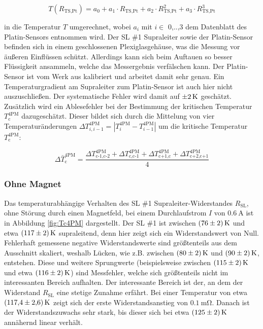 \begin{equation*}
  T(R_{\text{TS,Pt}}) = a_0 + a_1 \cdot R_{\text{TS,Pt}} + a_2 \cdot R_{\text{TS,Pt}}^2
  + a_3 \cdot R_{\text{TS,Pt}}^3
  \label{FA2}
\end{equation*}

\noindent
in die Temperatur $T$ umgerechnet, wobei $a_{i}$ mit $i \in$ {0,..,3} dem
Datenblatt des Platin-Sensors entnommen wird. Der SL \#1 Supraleiter sowie
der Platin-Sensor befinden sich in einem geschlossenen Plexiglasgehäuse, was
die Messung vor äußeren Einflüssen schützt. Allerdings kann sich beim Auftauen
so besser Flüssigkeit ansammeln, welche das Messergebnis verfälschen kann.
Der Platin-Sensor ist vom Werk aus kalibriert und arbeitet damit sehr genau.
Ein Temperaturgradient am Supraleiter zum Platin-Sensor ist auch hier nicht
auszuschließen. Der systematische Fehler wird damit auf $\SI{\pm2}{\kelvin}$
geschätzt. Zusätzlich wird ein Ablesefehler bei der Bestimmung der kritischen
Temperatur $T^{\text{4PM}}_{\text{c}}$ dazugeschätzt. Dieser bildet sich durch
die Mittelung von vier Temperaturänderungen $\Delta T^{\text{4PM}}_{i,i-1}
= |T^{\text{4PM}}_{i}-T^{\text{4PM}}_{i-1}|$
um die kritische Temperatur $T^{\text{4PM}}_{\text{c}}$:

\begin{equation*}
	\Delta \bar{T}^{\text{4PM}}_{\text{c}} = \frac{
																								 \Delta T^{\text{4PM}}_{\text{c-1,c-2}}
																								+\Delta T^{\text{4PM}}_{\text{c,c-1}}
																								+\Delta T^{\text{4PM}}_{\text{c+1,c}}
																								+\Delta T^{\text{4PM}}_{\text{c+2,c+1}}
																								}
																								{4}
\label{FA3}
\end{equation*}

\noindent

\subsubsection{Ohne Magnet}
\label{sec:ohneB}

Das temperaturabhängige Verhalten des SL \#1 Supraleiter-Widerstandes $R_{\text{SL}}$,
ohne Störung durch einen Magnetfeld, bei einem Durchlaufstrom
$I$ von $\SI{0.6}{\ampere}$ ist in Abbildung \ref{fig:Tc4PM} dargestellt. Der
SL \#1 ist zwischen $\SI{76\pm2}{\kelvin}$ und etwa $\SI{117\pm2}{\kelvin}$ supraleitend,
denn hier zeigt sich ein Widerstandswert von Null. Fehlerhaft gemessene negative
Widerstandswerte sind größtenteils
aus dem Ausschnitt skaliert, weshalb Lücken, wie z.B. zwischen $\SI{80\pm2}{\kelvin}$
und $\SI{90\pm2}{\kelvin}$, entstehen. Diese und weitere Sprungwerte (beispielsweise
zwischen $\SI{115\pm2}{\kelvin}$ und etwa $\SI{116\pm2}{\kelvin}$) sind Messfehler, welche
sich größtenteils nicht im interessanten Bereich aufhalten. Der interessante Bereich
ist der, an dem der Widerstand $R_{\text{SL}}$ eine stetige Zunahme erfährt.
Bei einer Temperatur von etwa $\SI{117,4\pm2,6}{\kelvin}$ zeigt sich der erste
Widerstandsanstieg von $\SI{0,1}{\milli\ohm}$. Danach ist der Widerstandszuwachs
sehr stark, bis dieser sich bei etwa $\SI{125\pm2}{\kelvin}$ annähernd linear
verhält.


